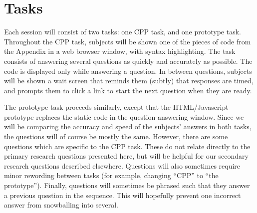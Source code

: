 \documentclass[11pt]{article}
\begin{document}
	
	
	
	
	\section{Tasks}
	\label{sec:tasks}
	
	Each session will consist of two tasks: one CPP task, and one prototype task.
	Throughout the CPP task, subjects will be shown one of the pieces of code from
	the Appendix in a web browser window, with syntax highlighting.  The task
	consists of answering several questions as quickly and accurately as possible.
	The code is displayed only while answering a question.  In between questions,
	subjects will be shown a wait screen that reminds them (subtly) that responses
	are timed, and prompts them to click a link to start the next question when
	they are ready.
	
	The prototype task proceeds similarly, except that the HTML/Javascript
	prototype replaces the static code in the question-answering window.  Since we
	will be comparing the accuracy and speed of the subjects' answers in both
	tasks, the questions will of course be mostly the same.  However, there are
	some questions which are specific to the CPP task.  These do not relate
	directly to the primary research questions presented here, but will be helpful
	for our secondary research questions described elsewhere.  Questions will also
	sometimes require minor rewording between tasks (for example, changing ``CPP''
	to ``the prototype'').
	Finally, questions will sometimes be phrased such that they answer a previous
	question in the sequence.  This will hopefully prevent one incorrect answer
	from snowballing into several.
	
\end{document}
